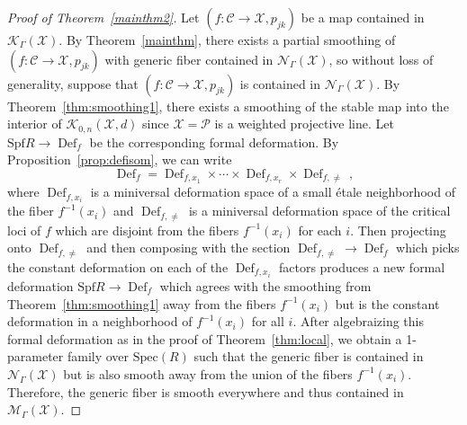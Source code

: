 \documentclass[11pt]{amsart}
\numberwithin{equation}{section}
\theoremstyle{definition}
\theoremstyle{remark}
\DeclareMathOperator{\Def}{Def}
\newcommand{\calK}{\mathcal K}
\newcommand{\calM}{\mathcal M}
\newcommand{\calN}{\mathcal N}
\newcommand{\calX}{\mathcal X}
\newcommand{\calC}{\mathcal C}
\newcommand{\calP}{\mathcal P}
\newcommand{\Spec}{\mathrm{Spec}}
\newcommand{\Spf}{\mathrm{Spf}}
\begin{document}
\begin{proof}[Proof of Theorem~\ref{mainthm2}] Let $(f \colon  \calC \to \calX, p_{jk})$ be a map contained in $\calK_\Gamma(\calX)$. By Theorem~\ref{mainthm}, there exists a partial smoothing of $(f \colon  \calC \to \calX, p_{jk})$ with generic fiber contained in $\calN_\Gamma(\calX)$, so without loss of generality, suppose that $(f \colon  \calC \to \calX, p_{jk})$ is contained in $\calN_\Gamma(\calX)$. By Theorem~\ref{thm:smoothing1}, there exists a smoothing of the stable map into the interior of $\calK_{0,n}(\calX, d)$ since $\calX = \calP$ is a weighted projective line. Let $\Spf R \to \Def_f$ be the corresponding formal deformation. By Proposition~\ref{prop:defisom}, we can write
$$
\Def_f = \Def_{f, x_1} \times \cdots\times \Def_{f,x_r} \times \Def_{f, \neq}\,,
$$
where $\Def_{f,x_i}$ is a miniversal deformation space of a small \'etale neighborhood of the fiber $f^{-1}(x_i)$ and $\Def_{f, \neq}$ is a miniversal deformation space of the critical loci of $f$ which are disjoint from the fibers $f^{-1}(x_i)$ for each $i$. Then projecting onto $\Def_{f,\neq}$ and then composing with the section $\Def_{f,\neq} \to \Def_f$ which picks the constant deformation on each of the $\Def_{f,x_i}$ factors produces a new formal deformation $\Spf R \to \Def_f$ which agrees with the smoothing from Theorem~\ref{thm:smoothing1} away from the fibers $f^{-1}(x_i)$ but is the constant deformation in a neighborhood of $f^{-1}(x_i)$ for all $i$. After algebraizing this formal deformation as in the proof of Theorem~\ref{thm:local}, we obtain a 1-parameter family over $\Spec (R)$ such that the generic fiber is contained in $\calN_{\Gamma}(\calX)$ but is also smooth away from the union of the fibers $f^{-1}(x_i)$. Therefore, the generic fiber is smooth everywhere and thus contained in $\calM_\Gamma(\calX)$. \end{proof} 
\end{document}
